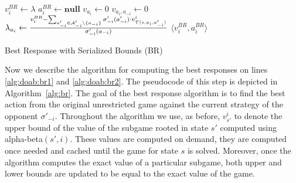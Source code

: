 \begin{algorithm2e}[t]
\small
{}
$v^{BR}_i \leftarrow \lambda$ \;
$a_i^{BR} \leftarrow \textbf{null}$ \;
 {%
	$v_{a_i} \leftarrow 0$\;
	 {\label{alg:br:opp}
    $v_{a_i,a_{-i}} \leftarrow 0$\;
		$\lambda_{a_i} \leftarrow \frac{v_i^{BR} - \sum_{a'_{-i} \in \mathcal{A}'_{-i} \setminus \lbrace a_{-i} \rbrace} \sigma'_{-i}(a'_{-i}) \cdot v^i_{\mathcal{T}(s,a_i,a'_{-i})}}{\sigma'_{-i}(a_{-i})}$\; \label{alg:br:bound}
	}
}
\Return $\langle v_i^{BR}, a_i^{BR} \rangle$
\caption{Best Response with Serialized Bounds (BR)}\label{alg:br}
\end{algorithm2e}

Now we describe the algorithm for computing the best responses on lines \ref{alg:doab:br1} and \ref{alg:doab:br2}.
The pseudocode of this step is depicted in Algorithm~\ref{alg:br}.
The goal of the best response algorithm is to find the best action from the original unrestricted game against the current strategy of the opponent $\sigma'_{-i}$.
Throughout the algorithm we use, as before, $v^i_{s'}$ to denote the upper bound of the value of the subgame rooted in state $s'$ computed using alpha-beta$(s',i)$.
These values are computed on demand, \ie they are computed once needed and cached until the game for state $s$ is solved.
Moreover, once the algorithm computes the exact value of a particular subgame, both upper and lower bounds are updated to be equal to the exact value of the game.


